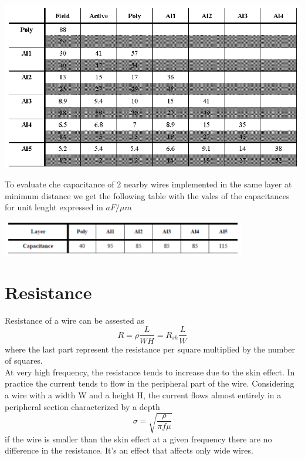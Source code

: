 \centering
\includegraphics[width=0.8  \textwidth]{C5_2.png}\\
\raggedright

\vspace{10mm}
To evaluate che capacitance of 2 nearby wires implemented in the same layer at minimum distance we get the following table with the vales of the capacitances for unit lenght expressed in $aF/\mu m$ \\
\vspace{3mm}

\centering
\includegraphics[width=0.8\textwidth]{C5_3.png}\\
\raggedright


\section{Resistance}

Resistance of a wire can be assested as
\begin{equation}
R=\rho \frac{L}{WH}=R_{sh}\frac{L}{W}
\end{equation} 
where the last part represent the resistance per square multiplied by the number of squares.\\
\vspace{5mm}
At very high frequency, the resistance tends to increase due to the skin effect. In practice the current tends to flow in the peripheral part of the wire. Considering a wire with a width W and a height H, the current flows almost entirely in a peripheral section characterized by a depth
\begin{equation}
\sigma=\sqrt{\frac{\rho}{\pi f \mu }}
\end{equation}
if the wire is smaller than the skin effect at a given frequency there are no difference in the resistance. It's an effect that affects only wide wires.\\


